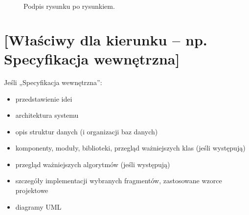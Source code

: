 \documentclass[a4paper,twoside,12pt]{book}
\begin{document}
 
\begin{figure}
\centering
{}
\caption{Podpis rysunku po rysunkiem.}
\label{fig:2}
\end{figure}



%
%
%
\chapter{[Właściwy dla kierunku -- np. Specyfikacja wewnętrzna]}
\label{ch:05}


Jeśli „Specyfikacja wewnętrzna”:
\begin{itemize}
\item przedstawienie idei
\item architektura systemu
\item opis struktur danych (i organizacji baz danych)
\item komponenty, moduły, biblioteki, przegląd ważniejszych klas (jeśli występują)
\item przegląd ważniejszych algorytmów (jeśli występują)
\item szczegóły implementacji wybranych fragmentów, zastosowane wzorce projektowe
\item diagramy UML
\end{itemize}

\end{document}
